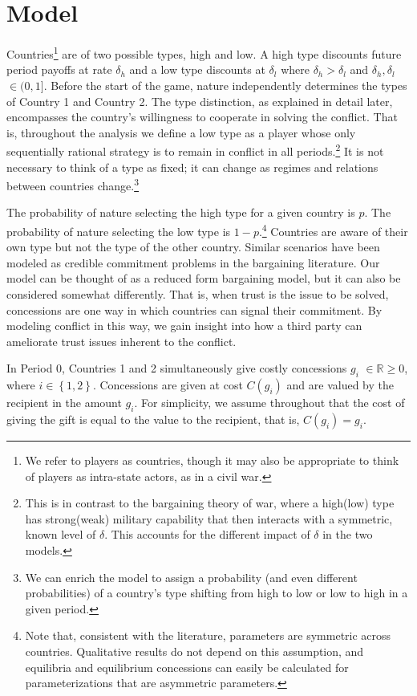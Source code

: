 \documentclass[bibtex,autowc]{apsr_submission}
\begin{document}
\section{Model}
\label{sec:model} 

Countries\footnote{We refer to players as countries, though it may also be appropriate to think of players as intra-state actors, as in a civil war.} are of two possible types, high and low. A high type discounts future period payoffs at rate $\delta_h$ and a low type discounts at $\delta_l$ where $\delta_h >\delta_l$ and $\delta_h ,\delta_l$ $\in (0,1].$ Before the start of the game, nature independently determines the types of Country 1 and Country 2. The type distinction, as explained in detail later, encompasses the country's willingness to cooperate in solving the conflict. That is, throughout the analysis we define a low type as a player whose only sequentially rational strategy is to remain in conflict in all periods.\footnote{This is in contrast to the bargaining theory of war, where a high(low) type has strong(weak) military capability that then interacts with a symmetric, known level of $\delta$. This accounts for the different impact of $\delta$ in the two models.} It is not necessary to think of a type as fixed; it can change as regimes and relations between countries change.\footnote{We can enrich the model to assign a probability (and even different probabilities) of a country's type shifting from high to low or low to high in a given period.}

The probability of nature selecting the high type for a given country is $p$. The probability of nature selecting the low type is $1-p$.\footnote{Note that, consistent with the literature, parameters are symmetric across countries. Qualitative results do not depend on this assumption, and equilibria and equilibrium concessions can easily be calculated for parameterizations that are asymmetric parameters.} Countries are aware of their own type but not the type of the other country. Similar scenarios have been modeled as credible commitment problems in the bargaining literature. Our model can be thought of as a reduced form bargaining model, but it can also be considered somewhat differently. That is, when trust is the issue to be solved, concessions are one way in which countries can signal their commitment. By modeling conflict in this way, we gain insight into how a third party can ameliorate trust issues inherent to the conflict. 

In Period 0, Countries 1 and 2 simultaneously give costly concessions $g_i$ $\in \mathbb{R} \geq 0$, where $i\in\left\{1,2\right\}$. Concessions are given at cost $C(g_i)$ and are valued by the recipient in the amount $g_i$. For simplicity, we assume throughout that the cost of giving the gift is equal to the value to the recipient, that is, $C(g_i)= g_i$.
\end{document}

